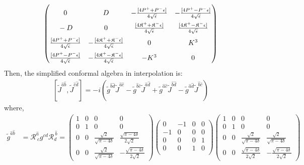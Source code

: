 \documentclass[]{article}
\numberwithin{equation}{section}
\begin{document}
{{\begin{align}
\begin{pmatrix}
    \rule{0pt}{16pt} 0&D&-\frac{[4P^{{+}}+P^{-}\epsilon]}{4\sqrt{\epsilon}}&-\frac{[4P^{{+}}-P^{-}\epsilon]}{4\sqrt{\epsilon}}\\
    \rule{0pt}{16pt} -D&0&\frac{[4\mathfrak{K}^{+}+\mathfrak{K}^{-}\epsilon]}{4\sqrt{\epsilon}}&\frac{[4\mathfrak{K}^{+}-\mathfrak{K}^{-}\epsilon]}{4\sqrt{\epsilon}}\\
    \rule{0pt}{16pt} \frac{[4P^{{+}}+P^{-}\epsilon]}{4\sqrt{\epsilon}}&-\frac{[4\mathfrak{K}^{+}+\mathfrak{K}^{-}\epsilon]}{4\sqrt{\epsilon}}&0  & K^3\\
    \rule{0pt}{16pt}\frac{[4P^{{+}}-P^{-}\epsilon]}{4\sqrt{\epsilon}}&-\frac{[4\mathfrak{K}^{+}-\mathfrak{K}^{-}\epsilon]}{4\sqrt{\epsilon}}&-K^3  & 0
  \end{pmatrix}
\end{align}
Then, the simplified conformal algebra in interpolation is:
  \begin{align}
      \left[\tilde{J}^{{\hat{a}}{\hat{b}}},\tilde{J}^{{\hat{c}}{\hat{d}}}\right]=-i\left(\tilde{g}^{{\hat{b}}{\hat{d}}}\tilde{J}^{{\hat{a}}{\hat{c}}}-\tilde{g}^{{\hat{b}}{\hat{c}}}\tilde{J}^{{\hat{a}}{\hat{d}}}+\tilde{g}^{{\hat{a}}{\hat{c}}}\tilde{J}^{{\hat{b}}{\hat{d}}}-\tilde{g}^{{\hat{a}}{\hat{d}}}\tilde{J}^{{\hat{b}}{\hat{c}}}\right)\label{simplesrint}
  \end{align}
where, 
\begin{align}
    \tilde{g}^{\hat{a}\hat{b}}&=\mathcal{R}^{\hat{a}}_{{~c}}g^{cd}\mathcal{R}^{~\hat{b}}_{{d}}=\begin{pmatrix}
    1&0&0&0\\
    0&1&0&0\\
    0&0&\frac{\sqrt{2}}{\sqrt{\pi-4\delta}} & \frac{\sqrt{\pi-4\delta}}{2\sqrt{2}}\\
    0&0&\frac{\sqrt{2}}{\sqrt{\pi-4\delta}} & -\frac{\sqrt{\pi-4\delta}}{2\sqrt{2}}
    \end{pmatrix}\begin{pmatrix}
  0&-1&0&0\\
  -1&0&0&0\\
  0&0&0&1\\
  0&0&1&0\\
  \end{pmatrix}\begin{pmatrix}
    1&0&0&0\\
    0&1&0&0\\
    0&0&\frac{\sqrt{2}}{\sqrt{\pi-4\delta}}  & \frac{\sqrt{2}}{\sqrt{\pi-4\delta}}\\
    0&0&\frac{\sqrt{\pi-4\delta}}{2\sqrt{2}}  & -\frac{\sqrt{\pi-4\delta}}{2\sqrt{2}}

\end{pmatrix}
\end{align}}}
\end{document}
